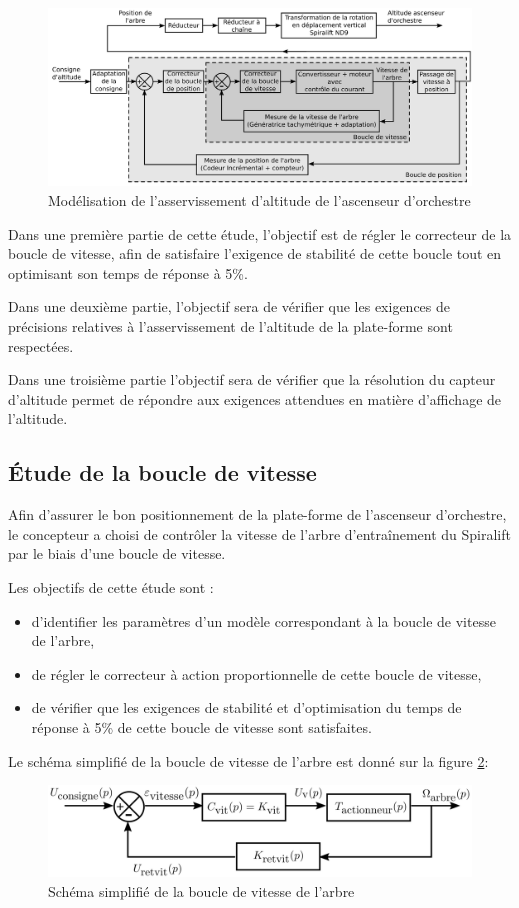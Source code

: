 \begin{figure}[!h]
 \centering\includegraphics[width=0.7\linewidth]{img/fig17}
 \caption{Modélisation de l'asservissement d'altitude de l'ascenseur d'orchestre}
 \label{fig17}
\end{figure}

Dans une première partie de cette étude, l'objectif est de régler le correcteur de la boucle de vitesse, afin de satisfaire l'exigence de stabilité de cette boucle tout en optimisant son temps de réponse à 5\%.

Dans une deuxième partie, l'objectif sera de vérifier que les exigences de précisions relatives à l'asservissement de l'altitude de la plate-forme sont respectées.

Dans une troisième partie l'objectif sera de vérifier que la résolution du capteur d'altitude permet de répondre aux exigences attendues en matière d'affichage de l'altitude.

\subsection{Étude de la boucle de vitesse}

Afin d'assurer le bon positionnement de la plate-forme de l'ascenseur d'orchestre, le concepteur a choisi de contrôler la vitesse de l'arbre d'entraînement du Spiralift par le biais d'une boucle de vitesse.

Les objectifs de cette étude sont :
\begin{itemize}
 \item d'identifier les paramètres d'un modèle correspondant à la boucle de vitesse de l'arbre,
 \item de régler le correcteur à action proportionnelle de cette boucle de vitesse,
 \item de vérifier que les exigences de stabilité et d'optimisation du temps de réponse à 5\% de cette boucle de vitesse sont satisfaites.
\end{itemize}

Le schéma simplifié de la boucle de vitesse de l'arbre est donné sur la figure \ref{fig18}:
\begin{figure}[!h]
 \centering\includegraphics[width=0.7\linewidth]{img/fig18}
 \caption{Schéma simplifié de la boucle de vitesse de l'arbre}
 \label{fig18}
\end{figure}

